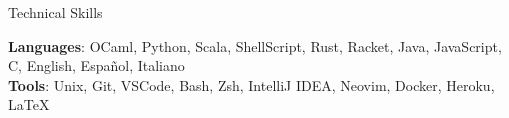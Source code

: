 
\begin{rSection}{Technical Skills}

	\textbf{Languages}: OCaml, Python, Scala, ShellScript, Rust, Racket, Java, JavaScript, C, English, Espa{\~n}ol, Italiano
	\\
	\textbf{Tools}: Unix, Git, VSCode, Bash, Zsh, IntelliJ IDEA, Neovim, Docker, Heroku, \LaTeX
\end{rSection}